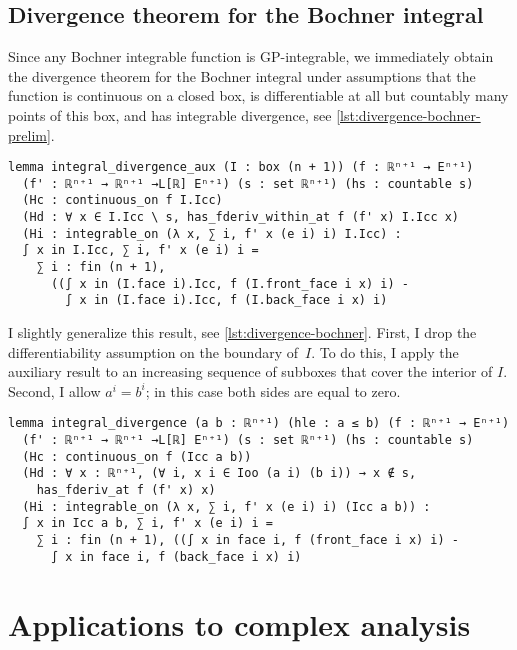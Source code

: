 \documentclass[a4paper, UKenglish,cleveref, autoref, thm-restate]{lipics-v2021}
\begin{document}
\subsection{Divergence theorem for the Bochner integral}%
\label{sec:diverg-theor-bochn}

Since any Bochner integrable function is GP-integrable, we immediately
obtain the divergence theorem for the Bochner integral under
assumptions that the function is continuous on a closed box, is
differentiable at all but countably many points of this box, and has
integrable divergence, see \autoref{lst:divergence-bochner-prelim}.

\begin{lstlisting}[caption={The divergence theorem for the Bochner integral, preliminary version},label=lst:divergence-bochner-prelim]
lemma integral_divergence_aux (I : box (n + 1)) (f : ℝⁿ⁺¹ → Eⁿ⁺¹)
  (f' : ℝⁿ⁺¹ → ℝⁿ⁺¹ →L[ℝ] Eⁿ⁺¹) (s : set ℝⁿ⁺¹) (hs : countable s)
  (Hc : continuous_on f I.Icc)
  (Hd : ∀ x ∈ I.Icc \ s, has_fderiv_within_at f (f' x) I.Icc x)
  (Hi : integrable_on (λ x, ∑ i, f' x (e i) i) I.Icc) :
  ∫ x in I.Icc, ∑ i, f' x (e i) i =
    ∑ i : fin (n + 1),
      ((∫ x in (I.face i).Icc, f (I.front_face i x) i) -
        ∫ x in (I.face i).Icc, f (I.back_face i x) i)
\end{lstlisting}

I slightly generalize this result, see
\autoref{lst:divergence-bochner}. First, I drop the differentiability
assumption on the boundary of~\(I\). To do this, I apply the auxiliary
result to an increasing sequence of subboxes that cover the interior
of \(I\). Second, I allow \(a^{i}=b^{i}\); in this case both sides are
equal to zero.

\begin{lstlisting}[caption={The divergence theorem for the Bochner integral},label=lst:divergence-bochner]
lemma integral_divergence (a b : ℝⁿ⁺¹) (hle : a ≤ b) (f : ℝⁿ⁺¹ → Eⁿ⁺¹)
  (f' : ℝⁿ⁺¹ → ℝⁿ⁺¹ →L[ℝ] Eⁿ⁺¹) (s : set ℝⁿ⁺¹) (hs : countable s)
  (Hc : continuous_on f (Icc a b))
  (Hd : ∀ x : ℝⁿ⁺¹, (∀ i, x i ∈ Ioo (a i) (b i)) → x ∉ s,
    has_fderiv_at f (f' x) x)
  (Hi : integrable_on (λ x, ∑ i, f' x (e i) i) (Icc a b)) :
  ∫ x in Icc a b, ∑ i, f' x (e i) i =
    ∑ i : fin (n + 1), ((∫ x in face i, f (front_face i x) i) -
      ∫ x in face i, f (back_face i x) i)
\end{lstlisting}

\section{Applications to complex analysis}%
\label{sec:appl-compl-analys}
\end{document}
